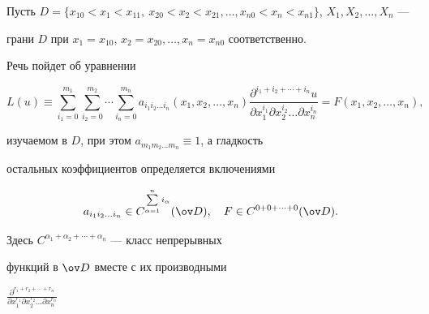  




\maketitle 


\label{begin} 


 


 


 


 


Пусть $D=\{x_{10}<x_1<x_{11},\ x_{20}<x_2<x_{21},\dotsc, 


x_{n0}<x_n<x_{n1}\}$, $X_1,X_2,\dotsc,X_n$ --- 


грани $D$ при $x_1=x_{10}$, $x_2=x_{20},\dotsc,x_n=x_{n0}$ соответственно. 


 


Речь пойдет об уравнении 


\begin{equation} 


L(u)\equiv\sum^{m_1}_{i_1=0}\sum^{m_2}_{i_2=0}\dotsb 


\sum^{m_n}_{i_n=0}a_{i_1 i_2\dotsc i_n}(x_1,x_2,\dotsc,x_n) 


\frac{\partial^{i_1+i_2+\dotsb+i_n}u} 


{\partial x^{i_1}_1\partial x^{i_2}_2\dotsc 


\partial x^{i_n}_n}=F(x_1,x_2,\dotsc,x_n), 


\end{equation} 


изучаемом в $D$, при этом $a_{m_1m_2\dotsc m_n}\equiv1$, а гладкость 


остальных коэффициентов определяется включениями 


$$ 


a_{i_1i_2\dotsc i_n}\in C^{\sum\limits^n_{\alpha=1}i_\alpha} 


(\ov D),\quad F\in C^{0+0+\dotsb+0}(\ov D). 


$$ 


Здесь $C^{\alpha_1+\alpha_2+\dotsb+\alpha_n}$ --- класс непрерывных 


функций в $\ov D$ вместе с их производными 


$\frac{\partial^{r_1+r_2+\dotsb+r_n}} 


{\partial x^{r_1}_1 \partial x^{r_2}_2\dotsc \partial x^{r_n}_n}$ 


